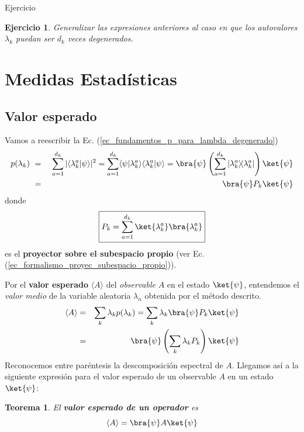 \documentclass[a4paper,11pt]{book} %
\newtheorem{teorema_contador}{Teorema}
\newcommand{\Teorema}[1]{
		\begin{mybox_gray2}{}
			\begin{teorema_contador}
				 #1 
			\end{teorema_contador} 
		\end{mybox_gray2}
	}
\newtheorem{ejercicio_contador}{Ejercicio}
\newcommand{\Ejercicio}[1]{
		\begin{mybox_gray}{Ejercicio} 
			\begin{ejercicio_contador}
				 #1 
			\end{ejercicio_contador} 
		\end{mybox_gray}
	}
\numberwithin{equation}{chapter}
\newcommand{\braket}[2]{\langle #1|#2\rangle}
\newcommand{\ketbra}[2]{| #1\rangle \! \langle #2|}
\begin{document}
	
	\Ejercicio{Generalizar las expresiones anteriores al caso en que los autovalores $\lambda_k$ puedan ser $d_k$ veces degenerados.
	}

	\section{Medidas Estadísticas}
	
		\subsection{Valor esperado}

Vamos a reescribir la Ec. (\ref{ec_fundamentos_p_para_lambda_degenerado})
\begin{eqnarray} \label{ec_fundamentos_p_para_lambda_degenerado_proyector}
p(\lambda_k)~ 
&=& ~ \sum_{a=1}^{d_k}|\braket{\lambda^a_k}{\psi}|^2 
 = \sum_{a=1}^{d_k} \braket{\psi}{\lambda^a_k}\braket{\lambda^a_k}{\psi}  
 =\bra{\psi}\left(\sum_{a=1}^{d_k}\ketbra{\lambda^a_k}{\lambda^a_k}\right) \ket{\psi}\nonumber\\
&=&  \bra{\psi}P_k\ket{\psi} 
\end{eqnarray}    
donde 
	\begin{equation}
	\boxed{P_k = \sum_{a=1}^{d_k} \ket{\lambda^a_k}\bra{\lambda^a_k}}
	\end{equation}
es el \textbf{proyector sobre el subespacio propio} (ver Ec. (\ref{ec_formalismo_proyec_subespacio_propio})).

Por el \textbf{valor esperado} $\langle A\rangle$ del \textit{observable} $A$ en el estado $\ket{\psi}$, entendemos el \textit{valor medio} de la variable aleatoria $\lambda_n$ obtenida por el método descrito. 
\begin{eqnarray}
\langle A\rangle 
	&= &  \sum_k \lambda_k p(\lambda_k)
     =  \sum_k \lambda_k \bra{\psi}P_k\ket{\psi}  \nonumber \\
	&=& \bra{\psi}\left(\sum_k \lambda_k P_k  \right) \ket{\psi} 
\end{eqnarray}
Reconocemos entre paréntesis la descomposición espectral de $A$. Llegamos así a la siguiente expresión para el valor esperado de un observable $A$ en un estado $\ket{\psi}$:
	
	\Teorema{ 
	El \textbf{valor esperado de un operador} es
		\begin{equation}
		\langle A \rangle=\bra{\psi}A \ket{\psi}
		\end{equation}
	}
\end{document}
